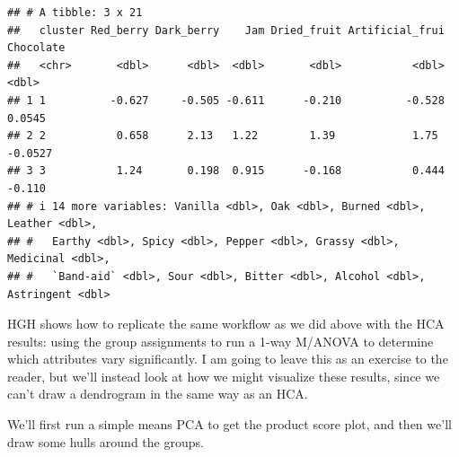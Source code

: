 \documentclass[
]{book}
\begin{document}
\begin{verbatim}
## # A tibble: 3 x 21
##   cluster Red_berry Dark_berry    Jam Dried_fruit Artificial_frui Chocolate
##   <chr>       <dbl>      <dbl>  <dbl>       <dbl>           <dbl>     <dbl>
## 1 1          -0.627     -0.505 -0.611      -0.210          -0.528    0.0545
## 2 2           0.658      2.13   1.22        1.39            1.75    -0.0527
## 3 3           1.24       0.198  0.915      -0.168           0.444   -0.110 
## # i 14 more variables: Vanilla <dbl>, Oak <dbl>, Burned <dbl>, Leather <dbl>,
## #   Earthy <dbl>, Spicy <dbl>, Pepper <dbl>, Grassy <dbl>, Medicinal <dbl>,
## #   `Band-aid` <dbl>, Sour <dbl>, Bitter <dbl>, Alcohol <dbl>, Astringent <dbl>
\end{verbatim}

HGH shows how to replicate the same workflow as we did above with the HCA results: using the group assignments to run a 1-way M/ANOVA to determine which attributes vary significantly. I am going to leave this as an exercise to the reader, but we'll instead look at how we might visualize these results, since we can't draw a dendrogram in the same way as an HCA.

We'll first run a simple means PCA to get the product score plot, and then we'll draw some hulls around the groups.
\end{document}
